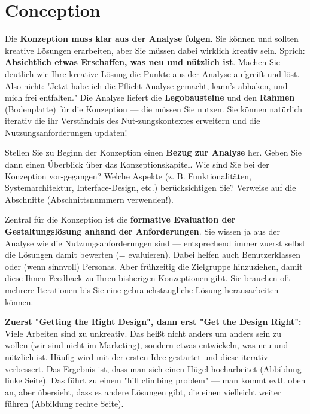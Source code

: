 \documentclass[11pt,a4paper,english]{scrreprt}
\newenvironment{comment}
  {\par\medskip
   \begingroup\color{olive}%
   }
 {\endgroup
  \medskip}
\begin{document}
\chapter{Conception}
\begin{comment}
Die \textbf{Konzeption muss klar aus der Analyse folgen}. Sie können und sollten kreative Lösungen erarbeiten, aber Sie müssen dabei wirklich kreativ sein. Sprich: \textbf{Absichtlich etwas Erschaffen, was neu und nützlich ist}. Machen Sie deutlich wie Ihre kreative Lösung die Punkte aus der Analyse aufgreift und löst. Also nicht: "Jetzt habe ich die Pflicht-Analyse gemacht, kann's abhaken, und mich frei entfalten." Die Analyse liefert die \textbf{Legobausteine} und den \textbf{Rahmen} (Bodenplatte) für die Konzeption — die müssen Sie nutzen. Sie können natürlich iterativ die ihr Verständnis des Nut-zungskontextes erweitern und die Nutzungsanforderungen updaten!

Stellen Sie zu Beginn der Konzeption einen \textbf{Bezug zur Analyse} her. Geben Sie dann einen Überblick über das Konzeptionskapitel. Wie sind Sie bei der Konzeption vor-gegangen? Welche Aspekte (z. B. Funktionalitäten, Systemarchitektur, Interface-Design, etc.) berücksichtigen Sie? Verweise auf die Abschnitte (Abschnittsnummern verwenden!).

Zentral für die Konzeption ist die \textbf{formative Evaluation der Gestaltungslösung anhand der Anforderungen}. Sie wissen ja aus der Analyse wie die Nutzungsanforderungen sind — entsprechend immer zuerst selbst die Lösungen damit bewerten (= evaluieren). Dabei helfen auch Benutzerklassen oder (wenn sinnvoll) Personas. Aber frühzeitig die Zielgruppe hinzuziehen, damit diese Ihnen Feedback zu Ihren bisherigen Konzeptionen gibt. Sie brauchen oft mehrere Iterationen bis Sie eine gebrauchstaugliche Lösung herausarbeiten können.

\textbf{Zuerst "Getting the Right Design", dann erst "Get the Design Right":} Viele Arbeiten sind zu unkreativ. Das heißt nicht anders um anders sein zu wollen (wir sind nicht im Marketing), sondern etwas entwickeln, was neu und nützlich ist. Häufig wird mit der ersten Idee gestartet und diese iterativ verbessert. Das Ergebnis ist, dass man sich einen Hügel hocharbeitet (Abbildung linke Seite). Das führt zu einem "hill climbing problem" — man kommt evtl. oben an, aber übersieht, dass es andere Lösungen gibt, die einen vielleicht weiter führen (Abbildung rechte Seite).


\end{comment}
\end{document}
